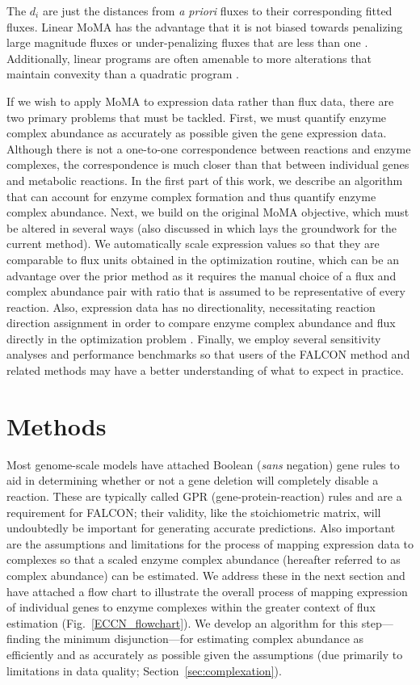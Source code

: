 The $d_i$ are just the distances from \textit{a priori} fluxes to
their corresponding fitted fluxes.  Linear MoMA has the advantage that
it is not biased towards penalizing large magnitude fluxes or
under-penalizing fluxes that are less than one
\citep{Boyd2004,Shlomi2005}. Additionally, linear programs are often
amenable to more alterations that maintain convexity than a quadratic
program \citep{Boyd2004}.

If we wish to apply MoMA to expression data rather than flux data, there
are two primary problems that must be tackled. First, we must quantify
enzyme complex abundance as accurately as possible given the gene expression
data. Although there is not a one-to-one correspondence between
reactions and enzyme complexes, the correspondence is much closer
than that between individual genes and metabolic reactions. In the
first part of this work, we describe an algorithm that can account for
enzyme complex formation and thus quantify enzyme complex
abundance. Next, we build on the original MoMA objective, which must
be altered in several ways (also discussed in \citealt{Lee2012} which
lays the groundwork for the current method). We automatically scale
expression values so that they are comparable to flux units obtained
in the optimization routine, which can be an advantage over the prior
method as it requires the manual choice of a flux and complex abundance pair
with ratio that is assumed to be representative of every reaction. 
Also, expression data has no directionality, necessitating
reaction direction assignment in order to compare enzyme complex
abundance and flux directly in the optimization problem
\citep{Lee2012}.  Finally, we employ several sensitivity analyses and
performance benchmarks so that users of the FALCON method and related
methods may have a better understanding of what to expect in practice.

\section{Methods}

Most genome-scale models have attached Boolean (\textit{sans}
negation) gene rules to aid in determining whether or not a gene
deletion will
completely disable a reaction. These are typically called GPR
(gene-protein-reaction) rules and are a requirement for FALCON; their
validity, like the stoichiometric matrix, will undoubtedly be
important for generating accurate predictions. Also important are the
assumptions and limitations for the process of mapping expression data
to complexes so that a scaled enzyme complex abundance (hereafter
referred to as complex abundance) can be estimated. We address these
in the next section and have attached a flow chart to illustrate the
overall process of mapping expression of individual genes to enzyme
complexes within the greater context of flux estimation 
(Fig.~\ref{ECCN_flowchart}). We develop an algorithm for
this step---finding the minimum disjunction---for estimating complex
abundance as efficiently and as accurately as possible given the
assumptions (due primarily to limitations in data quality; \suppOrApp
Section~\ref{sec:complexation}).


